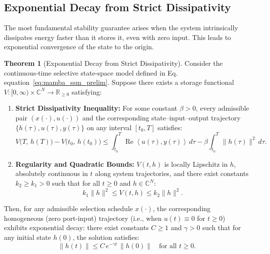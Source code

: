 \documentclass[10pt]{article} %
\def\eqref#1{equation~\ref{#1}}
\newcommand{\ip}[2]{\left\langle #1, #2 \right\rangle} %
\DeclareMathOperator{\realPart}{Re}                     %
\theoremstyle{definition}
\newtheorem{theorem}{Theorem}[section]
\begin{document}
\subsection{Exponential Decay from Strict Dissipativity}
The most fundamental stability guarantee arises when the system intrinsically dissipates energy faster than it stores it, even with zero input. This leads to exponential convergence of the state to the origin.

\begin{theorem}[Exponential Decay from Strict Dissipativity]
\label{thm:decay_from_V} %
Consider the continuous‐time selective state‐space model defined in Eq. \eqref{eq:mamba_ssm_prelim}. Suppose there exists a storage functional $V: [0, \infty) \times \mathbb{C}^N \to \mathbb{R}_{\ge 0}$ satisfying:
\begin{enumerate}[label=(\roman*)]
    \item \textbf{Strict Dissipativity Inequality:} For some constant $\beta > 0$, every admissible pair $(x(\cdot),u(\cdot))$ and the corresponding state--input--output trajectory $\{h(\tau),u(\tau),y(\tau)\}$ on any interval $[t_0, T]$ satisfies:
    \begin{equation} \label{eq:strict_dissipativity_repeat_sec3} %
    V\bigl(T,\,h(T)\bigr) - V\bigl(t_0,\,h(t_0)\bigr) \le \int_{t_0}^{T} \realPart\ip{u(\tau)}{y(\tau)}\,d\tau - \beta\int_{t_0}^{T}\!\|h(\tau)\|^2\,d\tau.
    \end{equation}
    \item \textbf{Regularity and Quadratic Bounds:} $V(t,h)$ is locally Lipschitz in $h$, absolutely continuous in $t$ along system trajectories, and there exist constants $k_2 \ge k_1 > 0$ such that for all $t \ge 0$ and $h \in \mathbb{C}^N$:
    \begin{equation} \label{eq:V_quadratic_bounds_sec3} %
    k_1 \|h\|^2 \le V(t,h) \le k_2 \|h\|^2.
    \end{equation}
\end{enumerate}
Then, for any admissible selection schedule $x(\cdot)$, the corresponding homogeneous (zero port-input) trajectory (i.e., when $u(t)\equiv 0$ for $t \ge 0$) exhibits exponential decay:
there exist constants $C \ge 1$ and $\gamma > 0$ such that for any initial state $h(0)$, the solution satisfies:
\begin{equation}
\|h(t)\| \le C \, e^{-\gamma t} \, \|h(0)\| \quad \text{for all } t \ge 0.
\end{equation}
\end{theorem}
\end{document}
